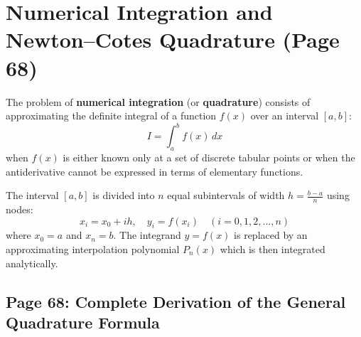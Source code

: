 \chapter[Numerical Integration and Newton--Cotes Quadrature]{Numerical Integration and\\Newton--Cotes Quadrature (Page 68)}
\label{ch:numerical_integration}

\begin{conceptbox}
The problem of \textbf{numerical integration} (or \textbf{quadrature}) consists of approximating the definite integral of a function $f(x)$ over an interval $[a, b]$:
\begin{equation}
    I = \int_{a}^{b} f(x) \, dx
\end{equation}
when $f(x)$ is either known only at a set of discrete tabular points or when the antiderivative cannot be expressed in terms of elementary functions.

The interval $[a, b]$ is divided into $n$ equal subintervals of width $h = \frac{b - a}{n}$ using nodes:
\begin{equation}
    x_i = x_0 + i h, \quad y_i = f(x_i) \quad (i = 0, 1, 2, \dots, n)
\end{equation}
where $x_0 = a$ and $x_n = b$. The integrand $y = f(x)$ is replaced by an approximating interpolation polynomial $P_n(x)$ which is then integrated analytically.
\end{conceptbox}

\section{Page 68: Complete Derivation of the General Quadrature Formula}
\label{sec:general_quadrature_derivation}


